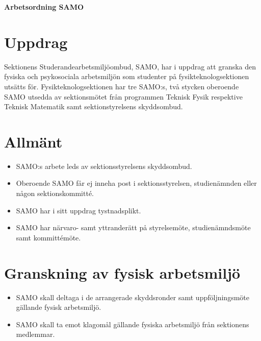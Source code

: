 
\renewcommand{\dateseparator}{-} %

\renewcommand{\forening}{SAMO}

\begin{center}
\LARGE{\textbf{Arbetsordning \forening}}
\end{center}



\section{Uppdrag}
Sektionens Studerandearbetsmiljöombud, SAMO, har i uppdrag att granska den fysiska och psykosociala arbetsmiljön som studenter på fysikteknologsektionen utsätts för.
Fysikteknologsektionen har tre SAMO:s, två stycken oberoende SAMO utsedda av sektionsmötet från programmen Teknisk Fysik respektive Teknisk Matematik samt sektionstyrelsens skyddsombud.

\section{Allmänt}
\begin{itemize}
\item SAMO:s arbete leds av sektionsstyrelsens skyddsombud.
\item Oberoende SAMO får ej inneha post i sektionsstyrelsen, studienämnden eller någon sektionskommitté.

\item SAMO har i sitt uppdrag tystnadsplikt.

\item SAMO har närvaro- samt yttranderätt på styrelsemöte, studienämndsmöte samt kommittémöte.

\end{itemize}

\section{Granskning av fysisk arbetsmiljö}
\begin{itemize}
\item SAMO skall deltaga i de arrangerade skyddsronder samt uppföljningsmöte gällande fysisk arbetsmiljö.

\item SAMO skall ta emot klagomål gällande fysiska arbetsmiljö från sektionens medlemmar.

\end{itemize}


